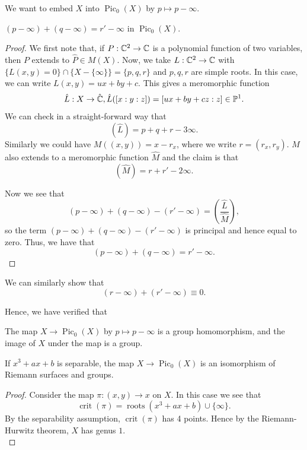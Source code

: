 \documentclass{article}
\begin{document}
{We want to embed $X$ into $\operatorname{Pic}_0(X)$ by $p \mapsto p - \infty$.
\begin{proposition}
    $(p - \infty) + (q - \infty) = r' - \infty$ in $\operatorname{Pic}_0(X)$.
\end{proposition}

\begin{proof}
 We first note that, if $P: \mathbb{C}^2 \to \mathbb{C}$ is a polynomial function of two variables, then $P$ extends to $\hat{P} \in M(X)$. Now, we take $L: \mathbb{C}^2 \to \mathbb{C}$ with $\{L(x, y) = 0\} \cap \{X - \{\infty\}\} = \{p, q, r\}$ and $p, q, r$ are simple roots. In this case, we can write $L(x, y) = ux + by + c$. This gives a meromorphic function
    \[\hat{L}: X \to \hat{\mathbb{C}}, \hat{L}([x: y: z]) = [ux + by + cz: z] \in \mathbb{P}^1.\]
    We can check in a straight-forward way that
    \[(\hat{L}) = p + q + r - 3 \infty.\]
    Similarly we could have $M((x, y)) = x - r_x$, where we write $r = (r_x, r_y)$. $M$ also extends to a meromorphic function $\hat{M}$ and the claim is that
    \[(\hat{M}) = r + r' - 2 \infty.\]

    Now we see that
    \[(p - \infty) + (q - \infty) - (r' - \infty) = (\frac{\hat{L}}{\hat{M}}),\]
   so the term $(p - \infty) + (q - \infty) - (r' - \infty)$ is principal and hence equal to zero. Thus, we have that
   $$(p - \infty) + (q - \infty) = r' - \infty.$$
\end{proof}

We can similarly show that 
\[(r - \infty) + (r' - \infty) \equiv 0.\]

Hence, we have verified that 
\begin{proposition}
    The map $X \to \operatorname{Pic}_0(X)$ by $p \mapsto p - \infty$ is a group homomorphism, and the image of $X$ under the map is a group.
\end{proposition}
   
\begin{theorem}
    If $x^3 + ax + b$ is separable, the map $X \to \operatorname{Pic}_0(X)$ is an isomorphism of Riemann surfaces and groups.
\end{theorem}

\begin{proof}
    Consider the map $\pi: (x, y) \to x$ on $X$. In this case we see that
    \[\operatorname{crit}(\pi) = \operatorname{roots}(x^3 + ax + b) \cup \{\infty\}.\]
    By the separability assumption, $\operatorname{crit}(\pi)$ has 4 points. Hence by the Riemann-Hurwitz theorem, $X$ has genus $1$.\\


\end{proof}}
\end{document}
